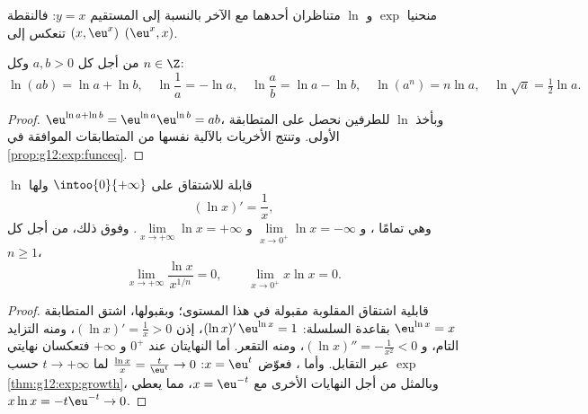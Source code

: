 \begin{omfigure}

{\small منحنيا $\exp$ و $\ln$ متناظران أحدهما مع الآخر
بالنسبة إلى المستقيم $y = x$: فالنقطة $(x, \eu^x)$ تنعكس إلى $(\eu^x, x)$.}
\end{omfigure}

\begin{proposition}\label{prop:g12:exp:lnalg}
من أجل كل $a, b > 0$ وكل $n \in \Z$:
\[
\ln(ab) = \ln a + \ln b, \quad
\ln\frac{1}{a} = -\ln a, \quad
\ln\frac{a}{b} = \ln a - \ln b, \quad
\ln(a^n) = n \ln a, \quad
\ln\sqrt{a} = \tfrac12 \ln a .
\]
\end{proposition}

\begin{proof}
$\eu^{\ln a + \ln b} = \eu^{\ln a}\eu^{\ln b} = ab$، وبأخذ $\ln$ للطرفين
نحصل على المتطابقة الأولى. وتنتج الأخريات بالآلية نفسها من
المتطابقات الموافقة في \cref{prop:g12:exp:funceq}.
\end{proof}

\begin{proposition}\label{prop:g12:exp:lnanalytic}
 $\ln$ قابلة للاشتقاق على $\intoo{0}{+\infty}$ ولها
\[
(\ln x)' = \frac{1}{x},
\]
وهي  تمامًا ، و
$\lim\limits_{x\to0^+} \ln x = -\infty$ و
$\lim\limits_{x\to+\infty} \ln x = +\infty$. وفوق ذلك، من أجل كل 
$n \geq 1$،
\[
\lim_{x\to+\infty} \frac{\ln x}{x^{1/n}} = 0, \qquad
\lim_{x\to0^+} x \ln x = 0 .
\]
\end{proposition}

\begin{proof}
قابلية اشتقاق  المقلوبة مقبولة في هذا المستوى؛ وبقبولها،
اشتق المتطابقة $\eu^{\ln x} = x$ بقاعدة السلسلة:
$(\ln x)'\,\eu^{\ln x} = 1$، إذن $(\ln x)' = \frac{1}{x} > 0$، ومنه التزايد
التام، و $(\ln x)'' = -\frac1{x^2} < 0$، ومنه التقعر. أما النهايتان عند
$0^+$ و $+\infty$ فتعكسان نهايتي $\exp$ عبر التقابل. وأما
، فعوّض $x = \eu^{t}$:
$\frac{\ln x}{x} = \frac{t}{\eu^t} \to 0$ لما $t \to +\infty$ حسب
\cref{thm:g12:exp:growth}، وبالمثل من أجل النهايات الأخرى مع
$x = \eu^{-t}$، مما يعطي $x\ln x = -t\eu^{-t} \to 0$.
\end{proof}

